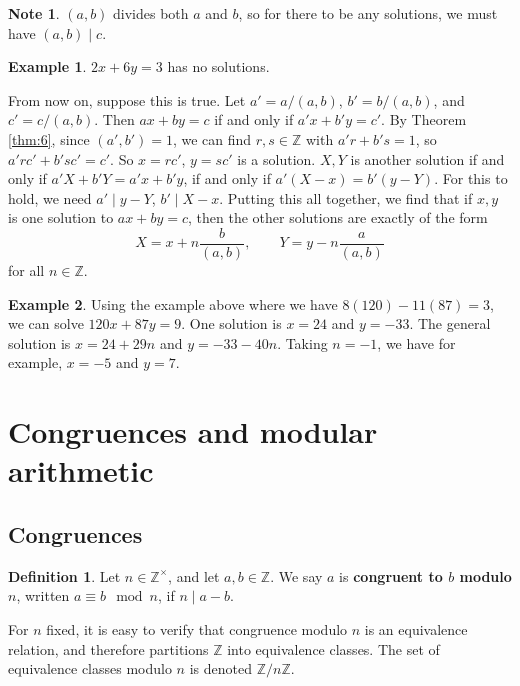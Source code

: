 \documentclass{article}
\newcommand{\Z}{\mathbb{Z}}
\newcommand{\rb}[1]{\left( #1 \right)}
\theoremstyle{definition}\newtheorem{definition}{Definition}
\theoremstyle{definition}\newtheorem{remark}[definition]{Remark}
\theoremstyle{definition}\newtheorem*{example}{Example}
\theoremstyle{definition}\newtheorem*{note}{Note}
\begin{document}
\begin{note}
$ \rb{a, b} $ divides both $ a $ and $ b $, so for there to be any solutions, we must have $ \rb{a, b} \mid c $.
\end{note}

\begin{example}
$ 2x + 6y = 3 $ has no solutions.
\end{example}

From now on, suppose this is true. Let $ a' = a / \rb{a, b} $, $ b' = b / \rb{a, b} $, and $ c' = c / \rb{a, b} $. Then $ ax + by = c $ if and only if $ a'x + b'y = c' $. By Theorem \ref{thm:6}, since $ \rb{a', b'} = 1 $, we can find $ r, s \in \Z $ with $ a'r + b's = 1 $, so $ a'rc' + b'sc' = c' $. So $ x = rc' $, $ y = sc' $ is a solution. $ X, Y $ is another solution if and only if $ a'X + b'Y = a'x + b'y $, if and only if $ a'\rb{X - x} = b'\rb{y - Y} $. For this to hold, we need $ a' \mid y - Y $, $ b' \mid X - x $. Putting this all together, we find that if $ x, y $ is one solution to $ ax + by = c $, then the other solutions are exactly of the form
$$ X = x + n\dfrac{b}{\rb{a, b}}, \qquad Y = y - n\dfrac{a}{\rb{a, b}} $$
for all $ n \in \Z $.

\begin{example}
Using the example above where we have $ 8\rb{120} - 11\rb{87} = 3 $, we can solve $ 120x + 87y = 9 $. One solution is $ x = 24 $ and $ y = -33 $. The general solution is $ x = 24 + 29n $ and $ y = -33 - 40n $. Taking $ n = -1 $, we have for example, $ x = -5 $ and $ y = 7 $.
\end{example}

\section{Congruences and modular arithmetic}

\subsection{Congruences}

\begin{definition}
Let $ n \in \Z^\times $, and let $ a, b \in \Z $. We say $ a $ is \textbf{congruent to $ b $ modulo $ n $}, written $ a \equiv b \mod n $, if $ n \mid a - b $.
\end{definition}

For $ n $ fixed, it is easy to verify that congruence modulo $ n $ is an equivalence relation, and therefore partitions $ \Z $ into equivalence classes. The set of equivalence classes modulo $ n $ is denoted $ \Z / n\Z $.
\end{document}
